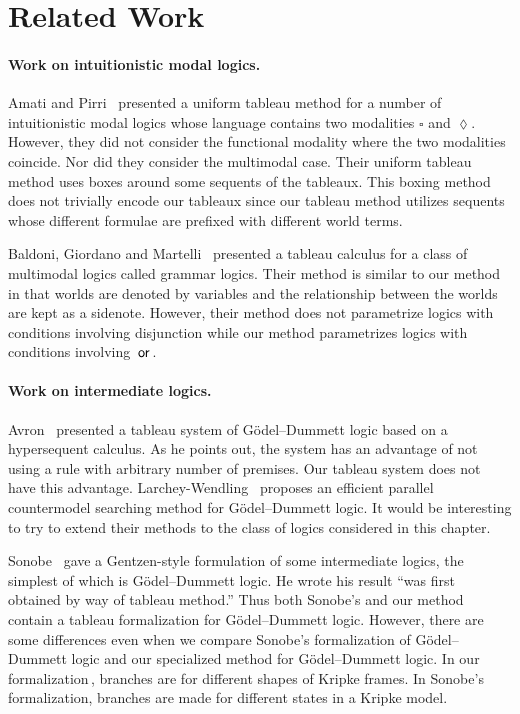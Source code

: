  \section{Related Work}

    \paragraph{Work on intuitionistic modal logics.}

    Amati and Pirri~\cite{amati94} presented a uniform tableau method for a number of
    intuitionistic modal logics whose language contains two modalities
    $\square$ and $\lozenge$.
    However, they did not consider the functional modality where the two
    modalities coincide.  Nor did they consider the multimodal case.
    Their uniform tableau method uses boxes around some sequents of the
    tableaux.  This boxing method does not trivially encode our tableaux since our
    tableau method utilizes sequents whose different formulae are prefixed
    with different world terms.

    Baldoni, Giordano and Martelli~\cite{baldoni98} presented a tableau
    calculus for a class of multimodal logics called grammar logics.
    Their method is similar to our method in that worlds are denoted by
    variables and the relationship between the worlds are kept as a
    sidenote.
    However, their method does not parametrize logics with conditions involving
    disjunction while our method parametrizes logics with conditions
    involving $\,\mathbin{\mathsf{or}}\,$.

    \paragraph{Work on intermediate logics.}

    Avron~\cite{avron2000} presented a tableau system of G\"odel--Dummett logic
    based on a hypersequent calculus.
    As he points out, the system has an advantage of not using a rule with
    arbitrary number of
    premises.  Our tableau system does not have this advantage.
    Larchey-Wendling~\cite{countermodelsearch} proposes an efficient parallel
    countermodel searching method for G\"odel--Dummett logic.
    It would be interesting to try to extend their methods to the
    class of logics considered in this chapter.

    Sonobe~\cite{sonobe} gave a Gentzen-style formulation of some
    intermediate logics, the simplest of which is G\"{o}del--Dummett logic.
    He wrote his result ``was first obtained by way of tableau method.''
    Thus both Sonobe's and our method contain a tableau formalization for
    G\"{o}del--Dummett logic.  However, there are some differences even when
    we compare Sonobe's formalization of G\"odel--Dummett logic and our
    specialized method for G\"odel--Dummett logic.
    In our formalization\,\LB, branches are for different shapes of Kripke
    frames.  In Sonobe's formalization, branches are made for different
    states in a Kripke model.

